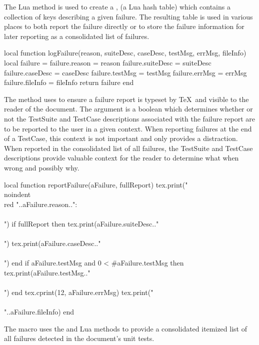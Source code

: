 The Lua  method is used to create a , (a Lua hash table) which contains a collection of keys describing 
a given failure. The resulting table is used in various places to both 
report the failure directly or to store the failure information for later 
reporting as a consolidated list of failures. 

\startLuaCode
local function logFailure(reason, suiteDesc, caseDesc,
                          testMsg, errMsg, fileInfo)
  local failure = {}
  failure.reason    = reason
  failure.suiteDesc = suiteDesc
  failure.caseDesc  = caseDesc
  failure.testMsg   = testMsg
  failure.errMsg    = errMsg
  failure.fileInfo  = fileInfo
  return failure
end
\stopLuaCode

The  method uses  to ensure a failure 
report is typeset by \TeX\ and visible to the reader of the document. The 
 argument is a boolean which determines whether or not 
the TestSuite and TestCase descriptions associated with the failure report 
are to be reported to the user in a given context. When reporting failures 
at the end of a TestCase, this context is not important and only provides 
a distraction. When reported in the consolidated list of all failures, the 
TestSuite and TestCase descriptions provide valuable context for the 
reader to determine what when wrong and possibly why. 

\startLuaCode
local function reportFailure(aFailure, fullReport)
  tex.print("\\noindent{\\red "..aFailure.reason.."}:\\\\")
  if fullReport then
    tex.print(aFailure.suiteDesc.."\\\\")
    tex.print(aFailure.caseDesc.."\\\\")
  end
  if aFailure.testMsg and 0 < #aFailure.testMsg then
    tex.print(aFailure.testMsg.."\\\\")
  end
  tex.cprint(12, aFailure.errMsg)
  tex.print("\\\\"..aFailure.fileInfo)
end
\stopLuaCode

The \type{\reportFailures} macro uses the  and 
 Lua methods to provide a consolidated itemized list 
of all failures detected in the document's unit tests. 

